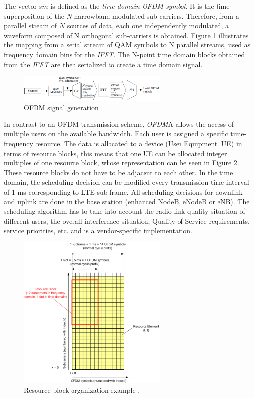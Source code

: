 The vector $sm$ is defined as the \emph{time-domain OFDM symbol}. It is the time
superposition of the $N$ narrowband modulated sub-carriers. Therefore, from a
parallel stream of $N$ sources of data, each one independently modulated, a
waveform composed of N orthogonal sub-carriers is obtained. Figure
\ref{fig:ofdmchain} illustrates the mapping from a serial stream of QAM symbols
to N parallel streams, used as frequency domain bins for the \textit{IFFT}. The
N-point time domain blocks obtained from the \textit{IFFT} are then serialized
to create a time domain signal.

\begin{figure}[htbp]
    \centering
    \includegraphics[width=0.65\textwidth]{./figures/ofdm_signal_chain}
    \caption{ OFDM signal generation \cite{umtslte}.
    \label{fig:ofdmchain}}
\end{figure}

In contrast to an OFDM transmission scheme, \textit{OFDM}A allows the access of
multiple users on the available bandwidth. Each user is assigned a specific
time-frequency resource. The data is allocated to a device (User Equipment, UE)
in terms of resource blocks, this means that one UE can be allocated integer
multiples of one resource block, whose representation can be seen in Figure
\ref{fig:ofdmresblk}. These resource blocks do not have to be adjacent to each
other. In the time domain, the scheduling decision can be modified every
transmission time interval of 1 ms corresponding to LTE sub-frame. All scheduling
decisions for downlink and uplink are done in the base station (enhanced NodeB,
eNodeB or eNB). The scheduling algorithm has to take into account the radio link
quality situation of different users, the overall interference situation,
Quality of Service requirements, service priorities, etc. and is a
vendor-specific implementation.

\begin{figure}[htbp]
    \centering
    \includegraphics[width=0.65\textwidth]{./figures/ofdm_resource_block}
    \caption{ Resource block organization example \cite{umtslte}.
    \label{fig:ofdmresblk}}
\end{figure}

